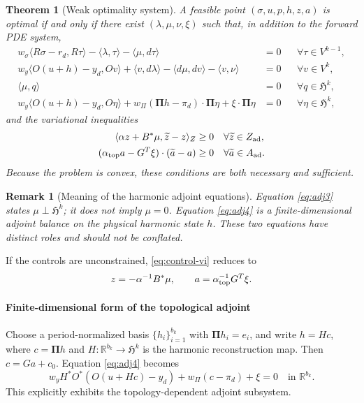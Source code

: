 \documentclass{article}
\newtheorem{theorem}{Theorem}[section]
\newtheorem{remark}{Remark}[section]
\newcommand{\R} {\mathbb R}
\newcommand{\HH}{\mathfrak H}
\newcommand{\Piop}{\boldsymbol\Pi}
\newcommand{\ip}[2]{\langle #1,#2\rangle}
\begin{document}
\begin{theorem}[Weak optimality system]\label{thm:optimality}
A feasible point $(\sigma,u,p,h,z,a)$ is optimal if and only if there exist $(\lambda,\mu,\nu,\xi)$ such that, in addition to the forward PDE system,
\begin{subequations}
\begin{align}
 w_\sigma\ip{R\sigma-r_d}{R\tau}
 -\ip{\lambda}{\tau}-\ip{\mu}{d\tau}&=0
 &&\forall\tau\in V^{k-1},\\
 w_y\ip{O(u+h)-y_d}{Ov}
 +\ip{v}{d\lambda}-\ip{d\mu}{dv}-\ip{v}{\nu}&=0
 &&\forall v\in V^k,\\
 \ip{\mu}{q}&=0
 &&\forall q\in\HH^k,\label{eq:adj3}\\
 w_y\ip{O(u+h)-y_d}{O\eta}
 +w_\Pi(\Piop h-\pi_d)\cdot\Piop\eta
 +\xi\cdot\Piop\eta&=0
 &&\forall\eta\in\HH^k,\label{eq:adj4}
\end{align}
\end{subequations}
and the variational inequalities
\begin{subequations}\label{eq:control-vi}
\begin{align}
 \ip{\alpha z+B^*\mu}{\widetilde z-z}_Z&\ge0
 &&\forall\widetilde z\in Z_{\rm ad},\label{eq:zvi}\\
 (\alpha_{\rm top}a-G^T\xi)\cdot(\widetilde a-a)&\ge0
 &&\forall\widetilde a\in A_{\rm ad}.\label{eq:avi}
\end{align}
\end{subequations}
Because the problem is convex, these conditions are both necessary and sufficient.
\end{theorem}

\begin{remark}[Meaning of the harmonic adjoint equations]
Equation \eqref{eq:adj3} states $\mu\perp\HH^k$; it does not imply $\mu=0$. Equation \eqref{eq:adj4} is a finite-dimensional adjoint balance on the physical harmonic state $h$. These two equations have distinct roles and should not be conflated.
\end{remark}

If the controls are unconstrained, \eqref{eq:control-vi} reduces to
\begin{equation}
 z=-\alpha^{-1}B^*\mu,
 \qquad
 a=\alpha_{\rm top}^{-1}G^T\xi.
\end{equation}

\paragraph{Finite-dimensional form of the topological adjoint}
Choose a period-normalized basis $\{h_i\}_{i=1}^{b_k}$ with $\Piop h_i=e_i$, and write $h=Hc$, where $c=\Piop h$ and $H:\R^{b_k}\to\HH^k$ is the harmonic reconstruction map. Then $c=Ga+c_0$. Equation \eqref{eq:adj4} becomes
\begin{equation}\label{eq:top-adjoint-matrix}
 w_y H^*O^*(O(u+Hc)-y_d)+w_\Pi(c-\pi_d)+\xi=0
 \quad\text{in }\R^{b_k}.
\end{equation}
This explicitly exhibits the topology-dependent adjoint subsystem.
\end{document}
